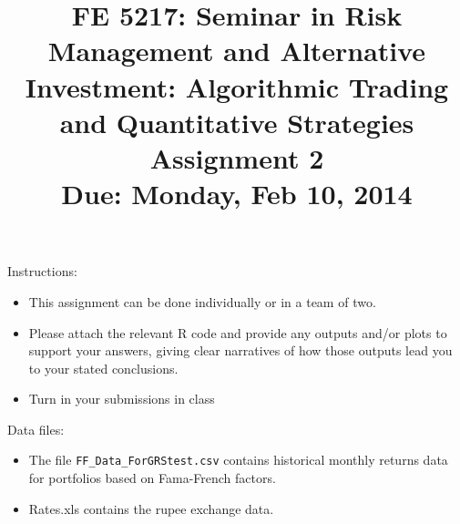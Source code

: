 \documentclass[12pt]{article}
\title{FE 5217: Seminar in Risk Management and Alternative Investment: Algorithmic Trading and Quantitative Strategies\\\vspace{5mm}Assignment 2\\\vspace{10mm}Due: Monday, Feb 10, 2014}
\date{}
\begin{document}
\maketitle

Instructions:
\begin{itemize}
\itemsep 3mm
\item This assignment can be done individually or in a team of two.
\item Please attach the relevant R code and provide any outputs and/or plots to support your answers, giving clear narratives of how those outputs lead you to your stated conclusions.
\item Turn in your submissions in class
\end{itemize}

\vspace{5mm}
Data files:
\begin{itemize}
\item The file {\tt FF\_Data\_ForGRStest.csv} contains historical monthly returns data for portfolios based on Fama-French factors.
\item Rates.xls contains the rupee exchange data.
\end{itemize}
\pagebreak
\end{document}
